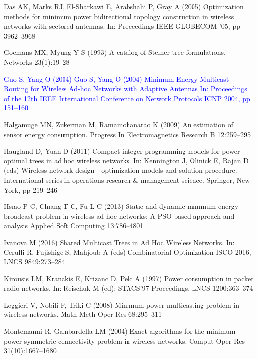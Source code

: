 \documentclass[natbib,smallextended]{svjour3}       %
\begin{document}
\begin{thebibliography}{}
Das AK, Marks RJ, El-Sharkawi E, Arabshahi P, Gray A (2005)
Optimization methods for minimum power bidirectional topology construction in wireless networks with sectored antennas.
In: Proceedings IEEE GLOBECOM ’05, pp 3962--3968

Goemans MX, Myung Y-S (1993)
A catalog of Steiner tree formulations.
Networks
23(1):19--28

\textcolor{blue}{Guo S, Yang O (2004)
Guo S, Yang O (2004)
Minimum Energy Multicast Routing for Wireless Ad-hoc Networks with Adaptive Antennas 
In: Proceedings of the 12th IEEE International Conference on Network Protocols ICNP 2004,
pp 151--160}

Halgamuge MN, Zukerman M, Ramamohanarao K (2009)
An estimation of sensor energy consumption.
Progress In Electromagnetics Research B 12:259--295

Haugland D, Yuan D (2011)
Compact integer programming models for power-optimal trees in ad hoc wireless networks.
In: Kennington J, Olinick E, Rajan D (eds) Wireless network design - optimization models and solution procedure.
International series in operations research \& management science.
Springer, New York, pp 219--246

Hsiao P-C, Chiang T-C, Fu L-C (2013)
Static and dynamic minimum energy broadcast problem in wireless ad-hoc networks: A PSO-based approach and analysis
Applied Soft Computing
13:786--4801

Ivanova M (2016)
Shared Multicast Trees in Ad Hoc Wireless Networks.
In: Cerulli R, Fujishige S, Mahjoub A (eds) Combinatorial Optimization ISCO 2016,
LNCS 9849:273--284

Kirousis LM, Kranakis E, Krizanc D, Pelc A (1997)
Power consumption in packet radio networks.
In: Reischuk M (ed): STACS'97 Proceedings,
LNCS 1200:363--374

Leggieri V, Nobili P, Triki C (2008)
Minimum power multicasting problem in wireless networks.
Math Meth Oper Res 68:295–311

Montemanni R, Gambardella LM (2004)
Exact algorithms for the minimum power symmetric connectivity problem in wireless networks.
Comput Oper Res 31(10):1667--1680


\end{thebibliography}
\end{document}
